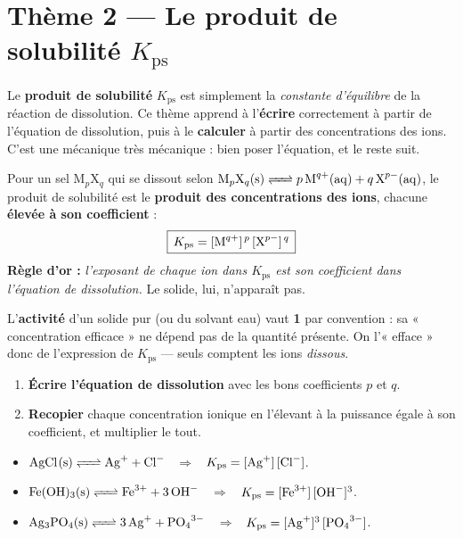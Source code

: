 \documentclass[11pt,a4paper]{article}
\begin{document}
\section*{\color{primarydark}Thème 2 — Le produit de solubilité $K_{\mathrm{ps}}$}

Le \textbf{produit de solubilité} $K_{\mathrm{ps}}$ est simplement la \emph{constante d'équilibre} de
la réaction de dissolution. Ce thème apprend à l'\textbf{écrire} correctement à partir de l'équation de
dissolution, puis à le \textbf{calculer} à partir des concentrations des ions. C'est une mécanique très
mécanique : bien poser l'équation, et le reste suit.

\begin{cle}
Pour un sel $\mathrm{M}_p\mathrm{X}_q$ qui se dissout selon
$\ce{M_{p}X_{q}(s) <=> p M^{q+}(aq) + q X^{p-}(aq)}$, le produit de solubilité est le
\textbf{produit des concentrations des ions}, chacune \textbf{élevée à son coefficient} :
\[ \boxed{\,K_{\mathrm{ps}} = [\ce{M^{q+}}]^{\,p}\,[\ce{X^{p-}}]^{\,q}\,} \]
\textbf{Règle d'or :} \emph{l'exposant de chaque ion dans $K_{\mathrm{ps}}$ est son coefficient dans
l'équation de dissolution.} Le solide, lui, n'apparaît pas.
\end{cle}

\begin{cle}[pourquoi le solide n'apparaît pas : activité $=1$]
L'\textbf{activité} d'un solide pur (ou du solvant eau) vaut \textbf{1} par convention : sa
« concentration efficace » ne dépend pas de la quantité présente. On l'« efface » donc de l'expression
de $K_{\mathrm{ps}}$ — seuls comptent les ions \emph{dissous}.
\end{cle}

\begin{methode}
\begin{enumerate}[leftmargin=1.7em,topsep=2pt,itemsep=1.5pt]
  \item \textbf{Écrire l'équation de dissolution} avec les bons coefficients $p$ et $q$.
  \item \textbf{Recopier} chaque concentration ionique en l'élevant à la puissance égale à son
        coefficient, et multiplier le tout.
\end{enumerate}
\end{methode}

\begin{exemplebox}
\begin{itemize}[leftmargin=1.6em,topsep=2pt,itemsep=2pt]
  \item $\ce{AgCl(s) <=> Ag^{+} + Cl^{-}}$ \ $\Rightarrow$ \ $K_{\mathrm{ps}} = [\ce{Ag+}]\,[\ce{Cl-}]$.
  \item $\ce{Fe(OH)3(s) <=> Fe^{3+} + 3 OH^{-}}$ \ $\Rightarrow$ \
        $K_{\mathrm{ps}} = [\ce{Fe^{3+}}]\,[\ce{OH-}]^{3}$.
  \item $\ce{Ag3PO4(s) <=> 3 Ag^{+} + PO4^{3-}}$ \ $\Rightarrow$ \
        $K_{\mathrm{ps}} = [\ce{Ag+}]^{3}\,[\ce{PO4^{3-}}]$.
\end{itemize}
\end{exemplebox}
\end{document}
